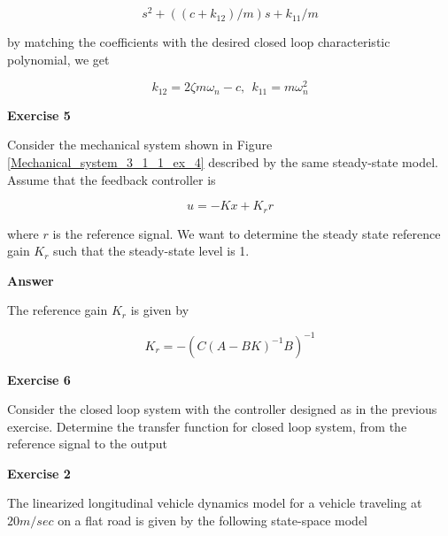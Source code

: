 \begin{equation}
s^2 + ((c + k_{12})/m)s + k_{11}/m
\end{equation}

by matching the coefficients with the desired closed loop characteristic polynomial, we get

\begin{equation}
k_{12} = 2 \zeta m\omega_{n} -c, ~~ k_{11} = m \omega_{n}^{2}
\end{equation}



\textbf{Exercise 5}

Consider the mechanical system shown in Figure \ref{Mechanical_system_3_1_1_ex_4} described by the same steady-state model. Assume that the feedback controller is

\begin{equation}
u = -Kx + K_r r 
\end{equation} 

where $r$ is the reference signal. We want to determine the steady state reference gain $K_r$ such that the steady-state level is 1.

\textbf{Answer}

The reference gain $K_r$ is given by 

\begin{equation}
K_r = - ( C(A-BK)^{-1}B)^{-1} 
\end{equation}


\textbf{Exercise 6}

Consider the closed loop system with the controller designed as in the previous exercise. Determine the transfer function for closed loop system, from the reference signal to the output


\textbf{Exercise 2}

The linearized longitudinal vehicle dynamics model for a vehicle traveling at $20 m/sec$ on a flat road is given by the following state-space model


